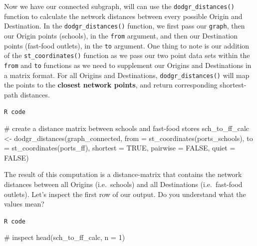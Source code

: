\documentclass[
  letterpaper,
  DIV=11,
  numbers=noendperiod]{scrreprt}
\newenvironment{Shaded}{\begin{snugshade}}{\end{snugshade}}
\newcommand{\AttributeTok}[1]{\textcolor[rgb]{0.40,0.45,0.13}{#1}}
\newcommand{\CommentTok}[1]{\textcolor[rgb]{0.37,0.37,0.37}{#1}}
\newcommand{\ConstantTok}[1]{\textcolor[rgb]{0.56,0.35,0.01}{#1}}
\newcommand{\DecValTok}[1]{\textcolor[rgb]{0.68,0.00,0.00}{#1}}
\newcommand{\FunctionTok}[1]{\textcolor[rgb]{0.28,0.35,0.67}{#1}}
\newcommand{\NormalTok}[1]{\textcolor[rgb]{0.00,0.23,0.31}{#1}}
\newcommand{\OtherTok}[1]{\textcolor[rgb]{0.00,0.23,0.31}{#1}}
\begin{document}
Now we have our connected subgraph, will can use the
\texttt{dodgr\_distances()} function to calculate the network distances
between every possible Origin and Destination. In the
\texttt{dodgr\_distances()} function, we first pass our \texttt{graph},
then our Origin points (schools), in the \texttt{from} argument, and
then our Destination points (fast-food outlets), in the \texttt{to}
argument. One thing to note is our addition of the
\texttt{st\_coordinates()} function as we pass our two point data sets
within the \texttt{from} and \texttt{to} functions as we need to
supplement our Origins and Destinations in a matrix format. For all
Origins and Destinations, \texttt{dodgr\_distances()} will map the
points to the \textbf{closest network points}, and return corresponding
shortest-path distances.

\begin{codelisting}

\caption{\texttt{R code}}

\begin{Shaded}
\begin{Highlighting}[]
\CommentTok{\# create a distance matrix between schools and fast{-}food stores}
\NormalTok{sch\_to\_ff\_calc }\OtherTok{\textless{}{-}} \FunctionTok{dodgr\_distances}\NormalTok{(graph\_connected, }\AttributeTok{from =} \FunctionTok{st\_coordinates}\NormalTok{(ports\_schools),}
    \AttributeTok{to =} \FunctionTok{st\_coordinates}\NormalTok{(ports\_ff), }\AttributeTok{shortest =} \ConstantTok{TRUE}\NormalTok{, }\AttributeTok{pairwise =} \ConstantTok{FALSE}\NormalTok{, }\AttributeTok{quiet =} \ConstantTok{FALSE}\NormalTok{)}
\end{Highlighting}
\end{Shaded}

\end{codelisting}

The result of this computation is a distance-matrix that contains the
network distances between all Origins (i.e.~schools) and all
Destinations (i.e.~fast-food outlets). Let's inspect the first row of
our output. Do you understand what the values mean?

\begin{codelisting}

\caption{\texttt{R code}}

\begin{Shaded}
\begin{Highlighting}[]
\CommentTok{\# inspect}
\FunctionTok{head}\NormalTok{(sch\_to\_ff\_calc, }\AttributeTok{n =} \DecValTok{1}\NormalTok{)}
\end{Highlighting}
\end{Shaded}

\end{codelisting}
\end{document}
